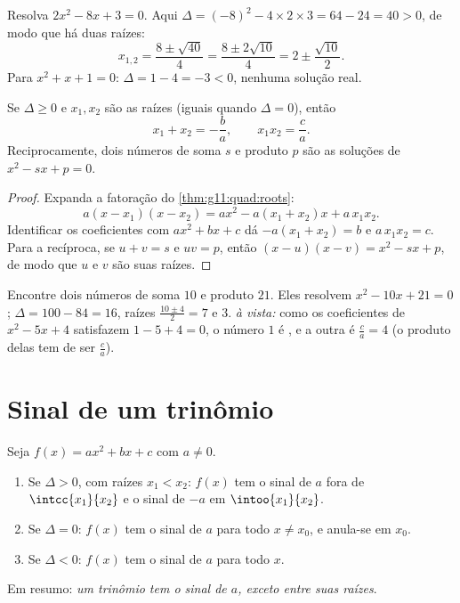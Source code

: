 \begin{example}\label{ex:g11:quad:solving}
Resolva $2x^2 - 8x + 3 = 0$. Aqui
$\Delta = (-8)^2 - 4 \times 2 \times 3 = 64 - 24 = 40 > 0$, de modo que
há duas raízes:
\[
x_{1,2} = \frac{8 \pm \sqrt{40}}{4} = \frac{8 \pm 2\sqrt{10}}{4}
= 2 \pm \frac{\sqrt{10}}{2}.
\]
Para $x^2 + x + 1 = 0$: $\Delta = 1 - 4 = -3 < 0$, nenhuma solução real.
\end{example}

\begin{proposition}\label{prop:g11:quad:vieta}
Se $\Delta \geq 0$ e $x_1, x_2$ são as raízes (iguais quando
$\Delta = 0$), então
\[
x_1 + x_2 = -\frac{b}{a},
\qquad
x_1 x_2 = \frac{c}{a} .
\]
Reciprocamente, dois números de soma $s$ e produto $p$ são as soluções de
$x^2 - sx + p = 0$.
\end{proposition}

\begin{proof}
Expanda a fatoração do \cref{thm:g11:quad:roots}:
\[
a(x - x_1)(x - x_2) = a x^2 - a(x_1 + x_2)x + a\,x_1 x_2 .
\]
Identificar os coeficientes com $ax^2 + bx + c$ dá $-a(x_1+x_2) = b$ e
$a\,x_1x_2 = c$. Para a recíproca, se $u + v = s$ e $uv = p$, então
$(x-u)(x-v) = x^2 - sx + p$, de modo que $u$ e $v$ são suas raízes.
\end{proof}

\begin{example}
Encontre dois números de soma $10$ e produto $21$. Eles resolvem
$x^2 - 10x + 21 = 0$; $\Delta = 100 - 84 = 16$, raízes
$\frac{10 \pm 4}{2} = 7$ e $3$. \emph{ à vista:} como os
coeficientes de $x^2 - 5x + 4$ satisfazem $1 - 5 + 4 = 0$, o número $1$ é
, e a outra é $\frac{c}{a} = 4$ (o produto delas tem de ser
$\frac ca$).
\end{example}

\section{Sinal de um trinômio}

\begin{theorem}\label{thm:g11:quad:sign}
Seja $f(x) = ax^2+bx+c$ com $a \neq 0$.
\begin{enumerate}
  \item Se $\Delta > 0$, com raízes $x_1 < x_2$: $f(x)$ tem o sinal de $a$
        fora de $\intcc{x_1}{x_2}$ e o sinal de $-a$ em
        $\intoo{x_1}{x_2}$.
  \item Se $\Delta = 0$: $f(x)$ tem o sinal de $a$ para todo
        $x \neq x_0$, e anula-se em $x_0$.
  \item Se $\Delta < 0$: $f(x)$ tem o sinal de $a$ para todo $x$.
\end{enumerate}
Em resumo: \emph{um trinômio tem o sinal de $a$, exceto entre suas
raízes}.
\end{theorem}

